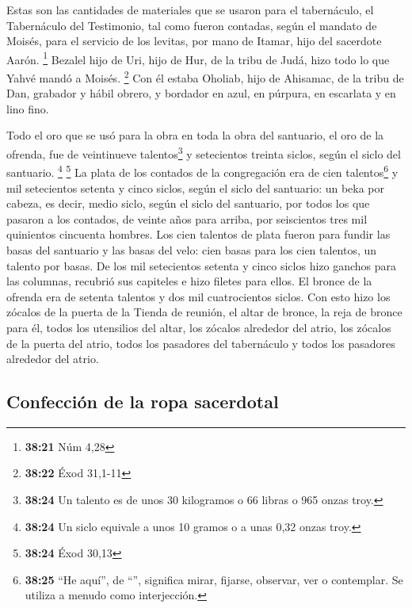  Estas son las cantidades de materiales que se usaron
para el tabernáculo, el Tabernáculo del Testimonio, tal como fueron
contadas, según el mandato de Moisés, para el servicio de los levitas,
por mano de Itamar, hijo del sacerdote Aarón. \footnote{\textbf{38:21}
  Núm 4,28}  Bezalel hijo de Uri, hijo de Hur, de la
tribu de Judá, hizo todo lo que Yahvé mandó a Moisés. \footnote{\textbf{38:22}
  Éxod 31,1-11}  Con él estaba Oholiab, hijo de Ahisamac,
de la tribu de Dan, grabador y hábil obrero, y bordador en azul, en
púrpura, en escarlata y en lino fino.

 Todo el oro que se usó para la obra en toda la obra del
santuario, el oro de la ofrenda, fue de veintinueve talentos\footnote{\textbf{38:24}
  Un talento es de unos 30 kilogramos o 66 libras o 965 onzas troy.} y
setecientos treinta siclos, según el siclo del santuario. \footnote{\textbf{38:24}
  Un siclo equivale a unos 10 gramos o a unas 0,32 onzas troy.}
\footnote{\textbf{38:24} Éxod 30,13}  La plata de los
contados de la congregación era de cien talentos\footnote{\textbf{38:25}
  ``He aquí'', de ``'', significa mirar, fijarse, observar,
  ver o contemplar. Se utiliza a menudo como interjección.} y mil
setecientos setenta y cinco siclos, según el siclo del santuario:
 un beka por cabeza, es decir, medio siclo, según el
siclo del santuario, por todos los que pasaron a los contados, de veinte
años para arriba, por seiscientos tres mil quinientos cincuenta hombres.
 Los cien talentos de plata fueron para fundir las basas
del santuario y las basas del velo: cien basas para los cien talentos,
un talento por basas.  De los mil setecientos setenta y
cinco siclos hizo ganchos para las columnas, recubrió sus capiteles e
hizo filetes para ellos.  El bronce de la ofrenda era de
setenta talentos y dos mil cuatrocientos siclos.  Con
esto hizo los zócalos de la puerta de la Tienda de reunión, el altar de
bronce, la reja de bronce para él, todos los utensilios del altar,
 los zócalos alrededor del atrio, los zócalos de la
puerta del atrio, todos los pasadores del tabernáculo y todos los
pasadores alrededor del atrio.

\hypertarget{confecciuxf3n-de-la-ropa-sacerdotal}{%
\subsection{Confección de la ropa
sacerdotal}\label{confecciuxf3n-de-la-ropa-sacerdotal}}

